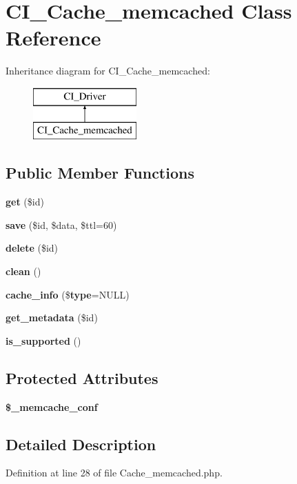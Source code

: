 \section{C\-I\-\_\-\-Cache\-\_\-memcached Class Reference}
\label{class_c_i___cache__memcached}
Inheritance diagram for C\-I\-\_\-\-Cache\-\_\-memcached\-:\begin{figure}[H]
\begin{center}
\leavevmode
\includegraphics[height=2.000000cm]{class_c_i___cache__memcached}
\end{center}
\end{figure}
\subsection*{Public Member Functions}
\begin{DoxyCompactItemize}
\item 
{\bf get} (\$id)
\item 
{\bf save} (\$id, \$data, \$ttl=60)
\item 
{\bf delete} (\$id)
\item 
{\bf clean} ()
\item 
{\bf cache\-\_\-info} (\${\bf type}=N\-U\-L\-L)
\item 
{\bf get\-\_\-metadata} (\$id)
\item 
{\bf is\-\_\-supported} ()
\end{DoxyCompactItemize}
\subsection*{Protected Attributes}
\begin{DoxyCompactItemize}
\item 
{\bf \$\-\_\-memcache\-\_\-conf}
\end{DoxyCompactItemize}


\subsection{Detailed Description}


Definition at line 28 of file Cache\-\_\-memcached.\-php.



